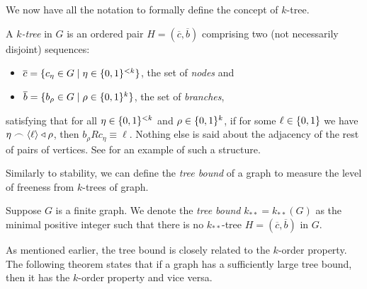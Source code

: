         We now have all the notation to formally define the concept of $k$-tree.

        \begin{definition} \label{def:k-tree}
            A \emph{$k$-tree} in $G$ is an ordered pair $H = (\overline{c},\overline{b})$ comprising two (not necessarily
            disjoint) sequences:
            \begin{itemize}
                \item $\overline{c} = \{  c_\eta \in G \mid \eta \in \{ 0,1 \}^{<k}  \}$, the set of \emph{nodes} and
                \item $\overline{b} = \{  b_\rho \in G \mid \rho \in \{ 0,1 \}^k  \}$, the set of \emph{branches},
            \end{itemize}
            satisfying that for all $\eta \in \{ 0,1 \}^{<k}$ and $\rho \in \{ 0,1 \}^k$,
            if for some $\ell \in \{ 0, 1 \}$ we have $\eta \frown \left< \ell \right> \triangleleft \rho$, then
            $b_\rho R c_\eta \equiv \ell$.
            Nothing else is said about the adjacency of the rest of pairs of vertices.
            See  for an example of such a structure.
        \end{definition}

        

        Similarly to stability, we can define the \emph{tree bound} of a graph to measure the level of freeness from $k$-trees
        of graph.

        \begin{definition} \label{def:tree_bound}
            Suppose $G$ is a finite graph.
            We denote the \emph{tree bound} $k_{**} = k_{**}(G)$ as the minimal positive integer such that there is no
            $k_{**}$-tree $H = (\overline{c},\overline{b})$ in $G$.
        \end{definition}

        As mentioned earlier, the tree bound is closely related to the $k$-order property.
        The following theorem states that if a graph has a sufficiently large tree bound, then it has the $k$-order property
        and vice versa.

